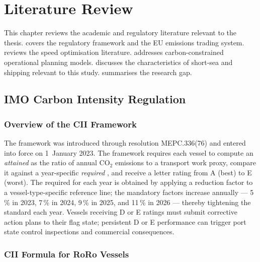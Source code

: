 \section{Literature Review}
\label{ch:literature}

This chapter reviews the academic and regulatory literature relevant to the
thesis.  covers the \IMO{} \CII{} regulatory framework and
the EU emissions trading system.  reviews the speed
optimisation literature.  addresses
carbon-constrained operational planning models. 
discusses the characteristics of short-sea and \RoRo{} shipping relevant
to this study.  summarises the research gap.

\subsection{IMO Carbon Intensity Regulation}
\label{sec:lit:reg}

\subsubsection{Overview of the CII Framework}
\label{sec:lit:cii_overview}

The \CII{} framework was introduced through \IMO{} resolution
MEPC.336(76) \parencite{mepc336} and entered into force on 1~January 2023.
The framework requires each vessel to compute an \textit{attained \CII{}}
as the ratio of annual CO$_2$ emissions to a transport work proxy, compare
it against a year-specific \textit{required \CII{}}, and receive a letter
rating from A (best) to E (worst).  The required \CII{} for each year is
obtained by applying a reduction factor to a vessel-type-specific reference
line; the mandatory factors increase annually --- 5\,\% in 2023, 7\,\% in
2024, 9\,\% in 2025, and 11\,\% in 2026 --- thereby tightening the standard
each year.  Vessels receiving D or E ratings must submit corrective action
plans to their flag state; persistent D or E performance can trigger port
state control inspections and commercial consequences.

\subsubsection{CII Formula for RoRo Vessels}
\label{sec:lit:cii_roro}

